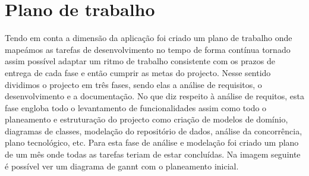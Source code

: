 \section{Plano de trabalho}
Tendo em conta a dimensão da aplicação foi criado um plano de trabalho onde mapeámos as tarefas
de desenvolvimento no tempo de forma contínua tornado assim possível adaptar um ritmo de trabalho
consistente com os prazos de entrega de cada fase e então cumprir as metas do projecto.
Nesse sentido dividimos o projecto em três fases, sendo elas a análise de requisitos, o
desenvolvimento e a documentação.
No que diz respeito à análise de requitos, esta fase engloba todo o levantamento 
de funcionalidades assim como todo o planeamento e estruturação do projecto como
criação de modelos de domínio, diagramas de classes, modelação do repositório de dados,
análise da concorrência, plano tecnológico, etc.
Para esta fase de análise e modelação foi criado um plano de um mês onde todas as tarefas 
teriam de estar concluídas. Na imagem seguinte é possível ver um diagrama de gannt com
o planeamento inicial.
